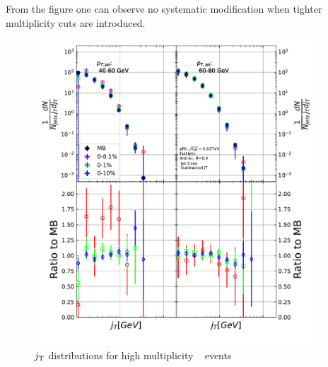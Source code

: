 From the figure one can observe no systematic modification when tighter multiplicity cuts are introduced. 

\begin{figure}[htb]
\includegraphics[width=0.95\textwidth]{results/HighMJetConeJtSignalPtFrom3To8.pdf}
\caption{$j_{\rm T}$ distributions for high multiplicity \pPb~ events }
\label{fig:highm}
\end{figure}




